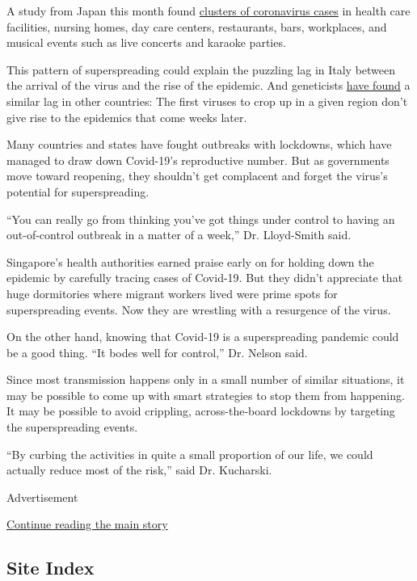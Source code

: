 A study from Japan this month found
\href{https://wwwnc.cdc.gov/eid/article/26/9/20-2272_article}{clusters
of coronavirus cases} in health care facilities, nursing homes, day care
centers, restaurants, bars, workplaces, and musical events such as live
concerts and karaoke parties.

This pattern of superspreading could explain the puzzling lag in Italy
between the arrival of the virus and the rise of the epidemic. And
geneticists
\href{https://www.nytimes.com/2020/05/27/health/coronavirus-spread-united-states.html}{have
found} a similar lag in other countries: The first viruses to crop up in
a given region don't give rise to the epidemics that come weeks later.

Many countries and states have fought outbreaks with lockdowns, which
have managed to draw down Covid-19's reproductive number. But as
governments move toward reopening, they shouldn't get complacent and
forget the virus's potential for superspreading.

``You can really go from thinking you've got things under control to
having an out-of-control outbreak in a matter of a week,'' Dr.
Lloyd-Smith said.

Singapore's health authorities earned praise early on for holding down
the epidemic by carefully tracing cases of Covid-19. But they didn't
appreciate that huge dormitories where migrant workers lived were prime
spots for superspreading events. Now they are wrestling with a
resurgence of the virus.

On the other hand, knowing that Covid-19 is a superspreading pandemic
could be a good thing. ``It bodes well for control,'' Dr. Nelson said.

Since most transmission happens only in a small number of similar
situations, it may be possible to come up with smart strategies to stop
them from happening. It may be possible to avoid crippling,
across-the-board lockdowns by targeting the superspreading events.

``By curbing the activities in quite a small proportion of our life, we
could actually reduce most of the risk,'' said Dr. Kucharski.

Advertisement

\protect\hyperlink{after-bottom}{Continue reading the main story}

\hypertarget{site-index}{%
\subsection{Site Index}\label{site-index}}


